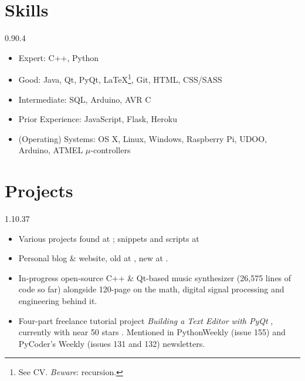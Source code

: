 \section{Skills}{0.9}{0.4}
\vspace{-2mm}
\begin{multicols}{2}
	\begin{itemize}
		\item Expert: C++, Python
		\item Good: Java, Qt, PyQt, \LaTeX\footnote{See CV. \emph{Beware}: recursion.}, Git, HTML, CSS/SASS
		\item Intermediate: SQL, Arduino, AVR C
		\item Prior Experience: JavaScript, Flask, Heroku
		\item (Operating) Systems: OS X, Linux, Windows, Raspberry Pi, UDOO, Arduino, ATMEL $\mu$-controllers
	\end{itemize}
\end{multicols}

\section{Projects}{1.1}{0.37}
\vspace{-5mm}
\begin{itemize}
	\item Various projects found at
	; snippets and scripts at 
	\item Personal blog \& website, old at , new at .
	\item In-progress open-source C++ \& Qt-based music synthesizer  (26,575 lines of code so far) alongside 120-page  on the math, digital signal processing and engineering behind it.
	\item Four-part freelance tutorial project \emph{Building a Text Editor with PyQt} , currently with near 50 stars . Mentioned in PythonWeekly (issue 155) and PyCoder's Weekly (issues 131 and 132) newsletters.
\end{itemize}

